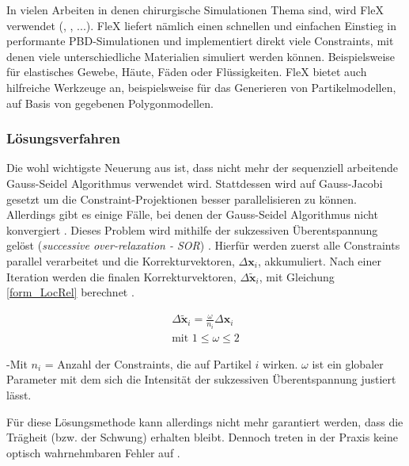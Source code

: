 In vielen Arbeiten in denen chirurgische Simulationen Thema sind, wird FleX verwendet (\cite{BreastBiopsy}, \cite{PBDKidney}, \cite{VRSim20} ...). FleX liefert nämlich einen schnellen und einfachen Einstieg in performante PBD-Simulationen und implementiert direkt viele Constraints, mit denen viele unterschiedliche Materialien simuliert werden können. Beispielsweise für elastisches Gewebe, Häute, Fäden oder Flüssigkeiten. FleX bietet auch hilfreiche Werkzeuge an, beispielsweise für das Generieren von Partikelmodellen, auf Basis von gegebenen Polygonmodellen.

\subsubsection{Lösungsverfahren}
Die wohl wichtigste Neuerung aus \cite{UPP} ist, dass nicht mehr der sequenziell arbeitende Gauss-Seidel Algorithmus verwendet wird. Stattdessen wird auf Gauss-Jacobi gesetzt um die Constraint-Projektionen besser parallelisieren zu können. Allerdings gibt es einige Fälle, bei denen der Gauss-Seidel Algorithmus nicht konvergiert \cite{UPP}.
Dieses Problem wird mithilfe der sukzessiven Überentspannung gelöst (\textit{successive over-relaxation - SOR}) \cite{UPP}. Hierfür werden zuerst alle Constraints parallel verarbeitet und die Korrekturvektoren, $\Delta \textbf{x}_i$, akkumuliert. Nach einer Iteration werden die finalen Korrekturvektoren, $\Delta \widetilde{\textbf{x}}_i$, mit Gleichung \ref{form_LocRel} berechnet \cite{UPP}.

\begin{equation}
\begin{split}
\Delta \widetilde{\textbf{x}}_i = \frac{\omega}{n_i} \Delta \textbf{x}_i \\
\text{mit }  1 \leq \omega \leq 2
\end{split}
\label{form_LocRel}
\end{equation}

-Mit $n_i$ = Anzahl der Constraints, die auf Partikel $i$ wirken. $\omega$ ist ein globaler Parameter mit dem sich die Intensität der sukzessiven Überentspannung justiert lässt.

Für diese Lösungsmethode kann allerdings nicht mehr garantiert werden, dass die Trägheit (bzw. der Schwung) erhalten bleibt. Dennoch treten in der Praxis keine optisch wahrnehmbaren Fehler auf \cite{UPP}.

